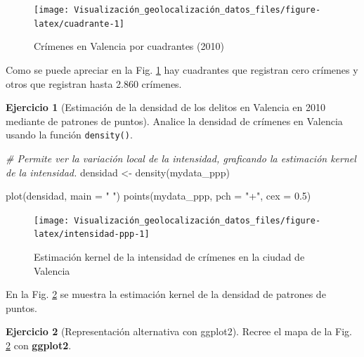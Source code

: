 \documentclass[
]{book}
\newenvironment{Shaded}{\begin{snugshade}}{\end{snugshade}}
\newcommand{\AttributeTok}[1]{\textcolor[rgb]{0.77,0.63,0.00}{#1}}
\newcommand{\CommentTok}[1]{\textcolor[rgb]{0.56,0.35,0.01}{\textit{#1}}}
\newcommand{\FloatTok}[1]{\textcolor[rgb]{0.00,0.00,0.81}{#1}}
\newcommand{\FunctionTok}[1]{\textcolor[rgb]{0.00,0.00,0.00}{#1}}
\newcommand{\NormalTok}[1]{#1}
\newcommand{\OtherTok}[1]{\textcolor[rgb]{0.56,0.35,0.01}{#1}}
\newcommand{\StringTok}[1]{\textcolor[rgb]{0.31,0.60,0.02}{#1}}
\theoremstyle{definition}
\theoremstyle{definition}
\theoremstyle{definition}
\newtheorem{exercise}{Ejercicio}[chapter]
\theoremstyle{definition}
\theoremstyle{remark}
\begin{document}
\begin{figure}

{\centering \texttt{[image: Visualización\_geolocalización\_datos\_files/figure-latex/cuadrante-1]} 

}

\caption{Crímenes en Valencia por cuadrantes (2010)}\label{fig:cuadrante}
\end{figure}

Como se puede apreciar en la Fig. \ref{fig:cuadrante} hay cuadrantes que
registran cero crímenes y otros que registran hasta 2.860 crímenes.

\begin{exercise}[Estimación de la densidad de los delitos en Valencia en 2010 mediante de patrones de puntos]
\protect\hypertarget{exr:ex33}{}\label{exr:ex33}Analice la densidad de crímenes en Valencia usando la función \texttt{density()}.
\end{exercise}

\begin{Shaded}
\begin{Highlighting}[]

\CommentTok{\# Permite ver la variación local de la intensidad, graficando la estimación kernel de la intensidad.}
\NormalTok{densidad }\OtherTok{\textless{}{-}} \FunctionTok{density}\NormalTok{(mydata\_ppp)}

\FunctionTok{plot}\NormalTok{(densidad, }\AttributeTok{main =} \StringTok{" "}\NormalTok{)}
\FunctionTok{points}\NormalTok{(mydata\_ppp, }\AttributeTok{pch =} \StringTok{"+"}\NormalTok{, }\AttributeTok{cex =} \FloatTok{0.5}\NormalTok{)}
\end{Highlighting}
\end{Shaded}

\begin{figure}

{\centering \texttt{[image: Visualización\_geolocalización\_datos\_files/figure-latex/intensidad-ppp-1]} 

}

\caption{Estimación kernel de la intensidad de crímenes en la ciudad de Valencia}\label{fig:intensidad-ppp}
\end{figure}

En la Fig. \ref{fig:intensidad-ppp} se muestra la estimación kernel de la
densidad de patrones de puntos.

\begin{exercise}[Representación alternativa con ggplot2]
Recree el mapa de la Fig. \ref{fig:intensidad-ppp} con \textbf{ggplot2}.
\end{exercise}
\end{document}
